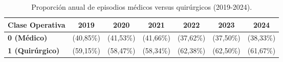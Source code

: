 \begin{table}[htbp]
\centering
\scriptsize
\setlength{\tabcolsep}{4pt}
\renewcommand{\arraystretch}{1.2}
\caption{Proporción anual de episodios médicos versus quirúrgicos (2019-2024).}
\label{tab:frecuencia_quirurgico}
\begin{tabular}{|l|c|c|c|c|c|c|}
\hline
\parbox[t]{2.5cm}{\textbf{Clase Operativa}} & 
\parbox[t]{1.6cm}{\centering\textbf{2019}} & 
\parbox[t]{1.6cm}{\centering\textbf{2020}} & 
\parbox[t]{1.6cm}{\centering\textbf{2021}} & 
\parbox[t]{1.6cm}{\centering\textbf{2022}} & 
\parbox[t]{1.6cm}{\centering\textbf{2023}} & 
\parbox[t]{1.6cm}{\centering\textbf{2024}} \\ \hline

\parbox[t]{2.5cm}{\textbf{0 (Médico)}} & \parbox[t]{1.6cm}{ (40,85\%)} & \parbox[t]{1.6cm}{ (41,53\%)} & \parbox[t]{1.6cm}{ (41,66\%)} & \parbox[t]{1.6cm}{ (37,62\%)} & \parbox[t]{1.6cm}{ (37,50\%)} & \parbox[t]{1.6cm}{ (38,33\%)} \\ \hline
\parbox[t]{2.5cm}{\textbf{1 (Quirúrgico)}} & \parbox[t]{1.6cm}{ (59,15\%)} & \parbox[t]{1.6cm}{ (58,47\%)} & \parbox[t]{1.6cm}{ (58,34\%)} & \parbox[t]{1.6cm}{ (62,38\%)} & \parbox[t]{1.6cm}{ (62,50\%)} & \parbox[t]{1.6cm}{ (61,67\%)} \\ \hline
\end{tabular}
\end{table}

